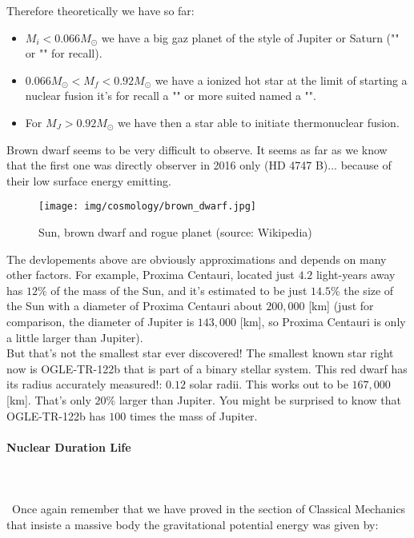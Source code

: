 	Therefore theoretically we have so far:
	\begin{itemize}
		\item $M_i<0.066M_\odot$ we have a big gaz planet of the style of Jupiter or Saturn ("" or "" for recall).

		\item $0.066M_\odot<M_f<0.92M_\odot$ we have a ionized hot star at the limit of starting a nuclear fusion it's for recall a "" or more suited named a "".

		\item For $M_J>0.92M_\odot$ we have then a star able to initiate thermonuclear fusion.
	\end{itemize}
	Brown dwarf seems to be very difficult to observe. It seems as far as we know that the first one was directly observer in 2016 only (HD 4747 B)... because of their low surface energy emitting.
	\begin{figure}[H]
		\begin{center}
		\texttt{[image: img/cosmology/brown\_dwarf.jpg]}
		\end{center}	
		\caption{Sun, brown dwarf and rogue planet (source: Wikipedia)}
	\end{figure}
	\begin{tcolorbox}[title=Remark,colframe=black,arc=10pt]
	The devlopements above are obviously approximations and depends on many other factors. For example, Proxima Centauri, located just $4.2$ light-years away has $12\%$ of the mass of the Sun, and it’s estimated to be just $14.5\%$ the size of the Sun with a diameter of Proxima Centauri about $200,000$ [km] (just for comparison, the diameter of Jupiter is $143,000$ [km], so Proxima Centauri is only a little larger than Jupiter).\\

	But that's not the smallest star ever discovered! The smallest known star right now is OGLE-TR-122b that is part of a binary stellar system. This red dwarf has its radius accurately measured!: $0.12$ solar radii. This works out to be $167,000$ [km]. That's only $20\%$ larger than Jupiter. You might be surprised to know that OGLE-TR-122b has $100$ times the mass of Jupiter.
	\end{tcolorbox}
	
	\paragraph{Nuclear Duration Life}\mbox{}\\\\\
	Once again remember that we have proved in the section of Classical Mechanics that insiste a massive body the gravitational potential energy was given by:
	

